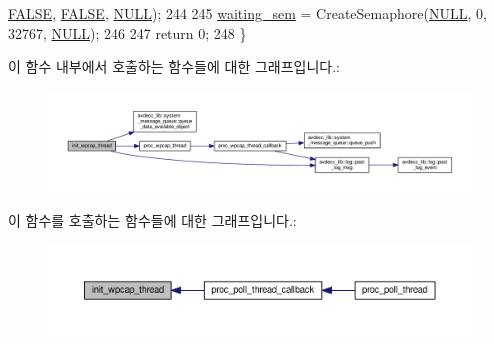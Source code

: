 \begin{DoxyCode}
      \hyperlink{maap__log_8h_aa93f0eb578d23995850d61f7d61c55c1}{FALSE}, \hyperlink{maap__log_8h_aa93f0eb578d23995850d61f7d61c55c1}{FALSE}, \hyperlink{openavb__types__base__pub_8h_a070d2ce7b6bb7e5c05602aa8c308d0c4}{NULL});
244 
245     \hyperlink{classavdecc__lib_1_1system__layer2__multithreaded__callback_a48196bb38ecccc4d99ae5c5d65e8b430}{waiting\_sem} = CreateSemaphore(\hyperlink{openavb__types__base__pub_8h_a070d2ce7b6bb7e5c05602aa8c308d0c4}{NULL}, 0, 32767, \hyperlink{openavb__types__base__pub_8h_a070d2ce7b6bb7e5c05602aa8c308d0c4}{NULL});
246 
247     \textcolor{keywordflow}{return} 0;
248 \}
\end{DoxyCode}


이 함수 내부에서 호출하는 함수들에 대한 그래프입니다.\+:
\nopagebreak
\begin{figure}[H]
\begin{center}
\leavevmode
\includegraphics[width=350pt]{classavdecc__lib_1_1system__layer2__multithreaded__callback_afbfb3e5823d8f6f0e012dc1b21e2deae_cgraph}
\end{center}
\end{figure}




이 함수를 호출하는 함수들에 대한 그래프입니다.\+:
\nopagebreak
\begin{figure}[H]
\begin{center}
\leavevmode
\includegraphics[width=350pt]{classavdecc__lib_1_1system__layer2__multithreaded__callback_afbfb3e5823d8f6f0e012dc1b21e2deae_icgraph}
\end{center}
\end{figure}


